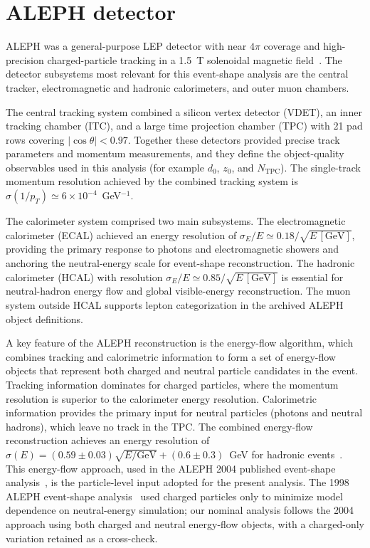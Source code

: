 \section{ALEPH detector}
\label{sec:aleph}

ALEPH was a general-purpose LEP detector with near $4\pi$ coverage and high-precision charged-particle tracking in a 1.5~T solenoidal magnetic field~\cite{Decamp:1990jra,ALEPH:1994ayc}. The detector subsystems most relevant for this event-shape analysis are the central tracker, electromagnetic and hadronic calorimeters, and outer muon chambers.

The central tracking system combined a silicon vertex detector (VDET), an inner tracking chamber (ITC), and a large time projection chamber (TPC) with 21 pad rows covering $|\cos\theta|<0.97$. Together these detectors provided precise track parameters and momentum measurements, and they define the object-quality observables used in this analysis (for example $d_0$, $z_0$, and $N_{\mathrm{TPC}}$). The single-track momentum resolution achieved by the combined tracking system is $\sigma(1/p_T)\simeq 6\times10^{-4}$~GeV$^{-1}$.

The calorimeter system comprised two main subsystems. The electromagnetic calorimeter (ECAL) achieved an energy resolution of $\sigma_E/E \simeq 0.18/\sqrt{E\,[\mathrm{GeV}]}$, providing the primary response to photons and electromagnetic showers and anchoring the neutral-energy scale for event-shape reconstruction. The hadronic calorimeter (HCAL) with resolution $\sigma_E/E \simeq 0.85/\sqrt{E\,[\mathrm{GeV}]}$ is essential for neutral-hadron energy flow and global visible-energy reconstruction. The muon system outside HCAL supports lepton categorization in the archived ALEPH object definitions.

A key feature of the ALEPH reconstruction is the energy-flow algorithm, which combines tracking and calorimetric information to form a set of energy-flow objects that represent both charged and neutral particle candidates in the event. Tracking information dominates for charged particles, where the momentum resolution is superior to the calorimeter energy resolution. Calorimetric information provides the primary input for neutral particles (photons and neutral hadrons), which leave no track in the TPC. The combined energy-flow reconstruction achieves an energy resolution of $\sigma(E) = (0.59\pm0.03)\sqrt{E/\text{GeV}} + (0.6\pm0.3)$~GeV for hadronic events~\cite{Heister:2003aj}. This energy-flow approach, used in the ALEPH 2004 published event-shape analysis~\cite{Heister:2003aj}, is the particle-level input adopted for the present analysis. The 1998 ALEPH event-shape analysis~\cite{Barate:1996fi} used charged particles only to minimize model dependence on neutral-energy simulation; our nominal analysis follows the 2004 approach using both charged and neutral energy-flow objects, with a charged-only variation retained as a cross-check.

